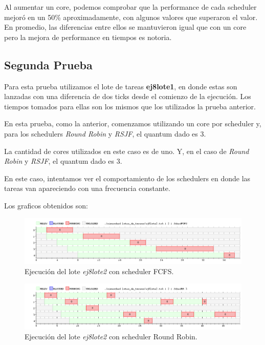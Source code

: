 Al aumentar un core, podemos comprobar que la performance de cada scheduler mejoró en un 50\% aproximadamente, con algunos valores que superaron el valor. En promedio, las diferencias entre ellos se mantuvieron igual que con un core pero la mejora de performance en tiempos es notoria.

\subsection{Segunda Prueba}

Para esta prueba utilizamos el lote de tareas \textbf{ej8lote1}, en donde estas son lanzadas con una diferencia de dos ticks desde el comienzo de la ejecución. Los tiempos tomados para ellas son los mismos que los utilizados la prueba anterior.

En esta prueba, como la anterior, comenzamos utilizando un core por scheduler y, para los schedulers \emph{Round Robin} y \emph{RSJF}, el quantum dado es 3.

La cantidad de cores utilizados en este caso es de uno. Y, en el caso de \emph{Round Robin} y \emph{RSJF}, el quantum dado es 3.

En este caso, intentamos ver el comportamiento de los schedulers en donde las tareas van apareciendo con una frecuencia constante.

Los graficos obtenidos son:

\begin{figure}[!h]
	\begin{center}
		\includegraphics[width=500px]{imagenes/ej8_prueba2_fcfs.png}
		\caption{Ejecución del lote \emph{ej8lote2} con scheduler FCFS.}
		\label{fig:grafico_ej8_prueba2_fcfs}
	\end{center}
\end{figure}

\begin{figure}[!h]
	\begin{center}
		\includegraphics[width=500px]{imagenes/ej8_prueba2_rr.png}
		\caption{Ejecución del lote \emph{ej8lote2} con scheduler Round Robin.}
		\label{fig:grafico_ej8_prueba2_rr}
	\end{center}
\end{figure}

